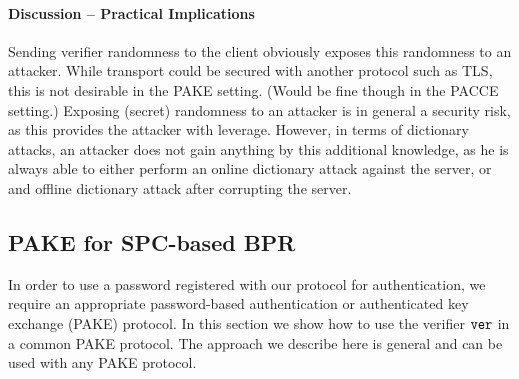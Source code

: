 %
%
%
%
%
%


\paragraph{Discussion -- Practical Implications}
Sending verifier randomness to the client obviously exposes this randomness to an attacker.
While transport could be secured with another protocol such as \ac{TLS}, this is not desirable in the \ac{PAKE} setting.
(Would be fine though in the \ac{PACCE} setting.)
Exposing (secret) randomness to an attacker is in general a security risk, as this provides the attacker with leverage.
However, in terms of dictionary attacks, an attacker does not gain anything by this additional knowledge, as he is always able to either perform an online dictionary attack against the server, or and offline dictionary attack after corrupting the server.

\subsection{PAKE for SPC-based BPR}
In order to use a password registered with our protocol for authentication, we require an appropriate password-based authentication or authenticated key exchange (PAKE) protocol.
In this section we show how to use the verifier $\mathtt{ver}$ in a common PAKE protocol. The approach we describe here is general and can be used with any PAKE protocol.

